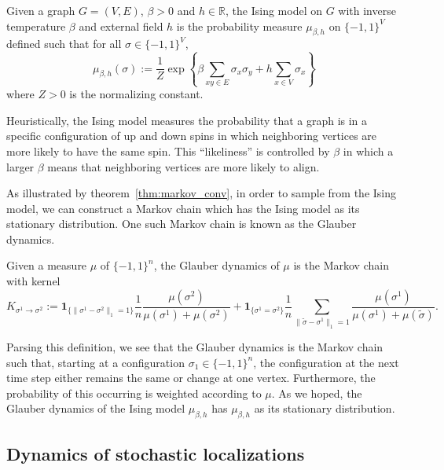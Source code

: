 \begin{definition}
  Given a graph \(G = (V, E)\), \(\beta > 0\) and \(h \in \mathbb{R}\), the Ising model on \(G\) 
  with inverse temperature \(\beta\) and external field \(h\) is the probability measure \(\mu_{\beta, h}\) on 
  \(\{-1, 1\}^V\) defined such that for all \(\sigma \in \{-1, 1\}^V\),
  \[\mu_{\beta, h}(\sigma) := 
    \frac{1}{Z} \exp\left\{\beta \sum_{xy \in E} \sigma_x \sigma_y + h \sum_{x \in V} \sigma_x\right\}\]
  where \(Z > 0\) is the normalizing constant.
\end{definition}

Heuristically, the Ising model measures the probability that a graph is in a specific configuration of 
up and down spins in which neighboring vertices are more likely to have the same spin. This ``likeliness'' 
is controlled by \(\beta\) in which a larger \(\beta\) means that neighboring vertices are more likely to
align. 

As illustrated by theorem~\ref{thm:markov_conv}, in order to sample from the Ising model, we can 
construct a Markov chain which has the Ising model as its stationary distribution. One such Markov chain 
is known as the Glauber dynamics.

\begin{definition}
  Given a measure \(\mu\) of \(\{-1, 1\}^n\), the Glauber dynamics of \(\mu\) is the Markov chain 
  with kernel 
  \[K_{\sigma^1 \to \sigma^2} := 
    \mathbf{1}_{\{\|\sigma^1 - \sigma^2\|_1 = 1\}}\frac{1}{n}\frac{\mu(\sigma^2)}{\mu(\sigma^1) + \mu(\sigma^2)}
  + \mathbf{1}_{\{\sigma^1 = \sigma^2\}} \frac{1}{n}\sum_{\|\tilde \sigma - \sigma^1\|_1 = 1}
    \frac{\mu(\sigma^1)}{\mu(\sigma^1) + \mu(\tilde \sigma)}.\]  
\end{definition}

Parsing this definition, we see that the Glauber dynamics is the Markov chain such that, starting at a 
configuration \(\sigma_1 \in \{-1, 1\}^n\), the configuration at the next time step either remains the 
same or change at one vertex. Furthermore, the probability of this occurring is weighted according to 
\(\mu\). As we hoped, the Glauber dynamics of the Ising model \(\mu_{\beta, h}\) has \(\mu_{\beta, h}\) 
as its stationary distribution.

\subsection{Dynamics of stochastic localizations}